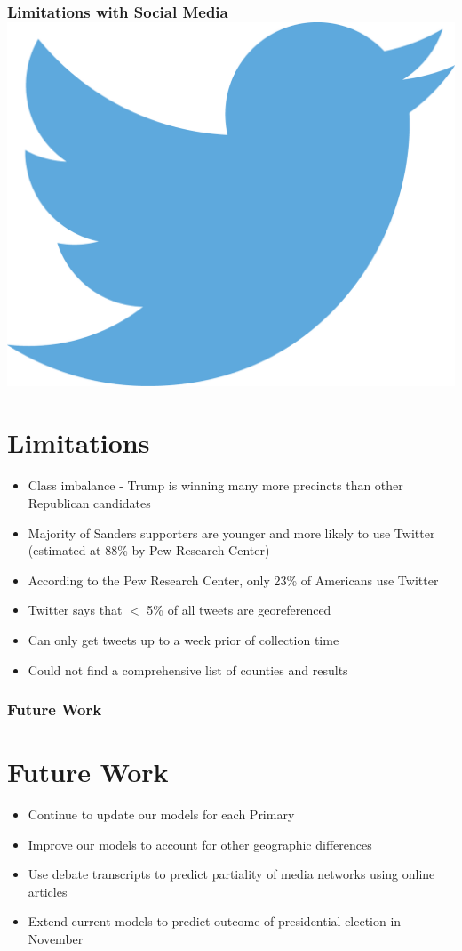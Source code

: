 \documentclass[xcolor=dvipsnames]{beamer}
\begin{document}
\begin{frame}
\frametitle{Limitations with Social Media \hfill \hfill \includegraphics[scale=.1]{twitterlogo.png}}
\section{Limitations}
\begin{itemize}
	\item Class imbalance - Trump is winning many more precincts than other Republican candidates
	\item Majority of Sanders supporters are younger and more likely to use Twitter (estimated at 88\% by Pew Research Center)
	\item According to the Pew Research Center, only 23\% of Americans use Twitter
	\item Twitter says that $<$ 5\% of all tweets are georeferenced
	\item Can only get tweets up to a week prior of collection time
	\item Could not find a comprehensive list of counties and results
	
\end{itemize}

\end{frame}

\begin{frame}
\frametitle{Future Work}
\section{Future Work}
\begin{itemize}
\item Continue to update our models for each Primary
\item Improve our models to account for other geographic differences
\item Use debate transcripts to predict partiality of media networks using online articles 
\item Extend current models to predict outcome of presidential election in November
\end{itemize}
\end{frame}
\end{document}
